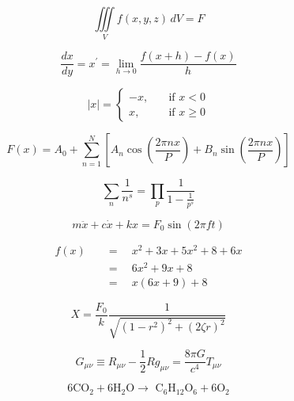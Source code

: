 \documentclass{article}
\begin{document}
    \thispagestyle{empty}


    \[ 
        \iiint\limits_V f(x,y,z)\,dV = F 
    \]
    
    \[ 
        \frac{dx}{dy} = 
        x^{\prime} = 
        \lim_{h\to0} \frac {f\left(x+h\right)-f\left(x\right)} {h} 
    \]
    
    \[
        \left|x\right| = 
        \begin{cases}
            -x, & \quad{\text{if } x < \text{0}} \\ 
            x, & \quad{\text{if } x \geq \text{0}}
        \end{cases}
    \]
    
    \[ 
        F\left(x\right) = A_0 +
        \displaystyle\sum_{n\mathop{=}1}^N
        \left\lbrack 
            A_n\cos\left(\frac{2\pi nx}{P}\right) + 
            B_n\sin\left(\frac{2\pi nx}{P}\right)
        \right\rbrack 
    \]
    
    \[
        \displaystyle\sum_{n} \frac{1}{n^s} = \prod_{p} \frac{1}{1-\frac{1}{p^s}}
    \]

    \[ 
        m\ddot{x} + c\dot{x} + kx = 
        F_0\sin\left(2\pi ft\right) 
    \]  
    
    \[ 
        \begin{split}
            f(x)\quad   &= \quad x^2 + 3x + 5x^2 +8 +6x\\
                        &= \quad 6x^2 +9x +8\\
                        &= \quad x(6x+9)+8
        \end{split} 
    \]
    
    \[
        X = 
        \frac{F_0}{k} 
        \frac{1}{\sqrt{\left(1-r^2\right)^2 + \left(2\zeta r\right)^2}} 
    \]
    
    \[ G_{\mu\nu}\equiv R_{\mu\nu}-\frac{1}{2}Rg_{\mu\nu}=\frac{8\pi G}{c^4}T_{\mu\nu} \]
    
    \[ 
        6\text{CO}_2+6\text{H}_2\text{O} 
        \to 
        \text{ C}_6\text{H}_{12}\text{O}_6+6\text{O}_2
    \]
    
\end{document}
